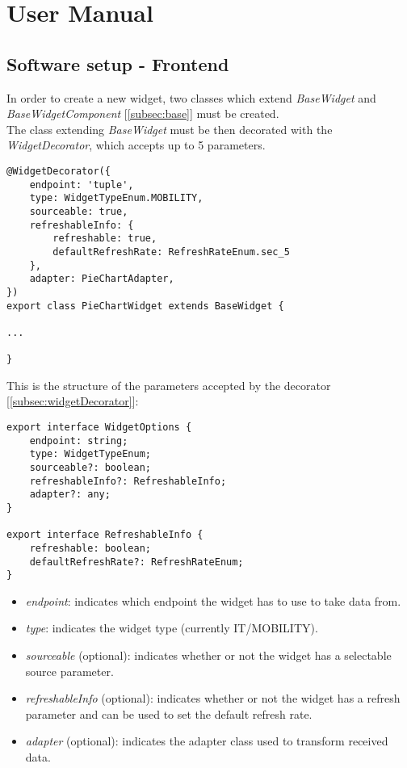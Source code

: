 \chapter{User Manual}
\section{Software setup - Frontend}
In order to create a new widget, two classes which extend \textit{BaseWidget} and \textit{BaseWidgetComponent} [\ref{subsec:base}] must be created.\\
The class extending \textit{BaseWidget} must be then decorated with the \textit{WidgetDecorator}, which accepts up to 5 parameters.
\begin{lstlisting}[caption={PieChartWidget example}, style=javaScriptCode]
@WidgetDecorator({
    endpoint: 'tuple',
    type: WidgetTypeEnum.MOBILITY,
    sourceable: true,
    refreshableInfo: {
        refreshable: true,
        defaultRefreshRate: RefreshRateEnum.sec_5
    },
    adapter: PieChartAdapter,
})
export class PieChartWidget extends BaseWidget {

...

}
\end{lstlisting}
This is the structure of the parameters accepted by the decorator [\ref{subsec:widgetDecorator}]:
\begin{lstlisting}[caption={Structure of WidgetOptions}, style=javaScriptCode]
export interface WidgetOptions {
    endpoint: string;
    type: WidgetTypeEnum;
    sourceable?: boolean;
    refreshableInfo?: RefreshableInfo; 
    adapter?: any;
}

export interface RefreshableInfo {
    refreshable: boolean;
    defaultRefreshRate?: RefreshRateEnum;
}
\end{lstlisting}
\begin{itemize}
    \item \textit{endpoint}: indicates which endpoint the widget has to use to take data from.
    \item \textit{type}: indicates the widget type (currently IT/MOBILITY).
    \item \textit{sourceable} (optional): indicates whether or not the widget has a selectable source parameter.
    \item \textit{refreshableInfo} (optional): indicates whether or not the widget has a refresh parameter and can be used to set the default refresh rate.
    \item \textit{adapter} (optional): indicates the adapter class used to transform received data.
\end{itemize}
